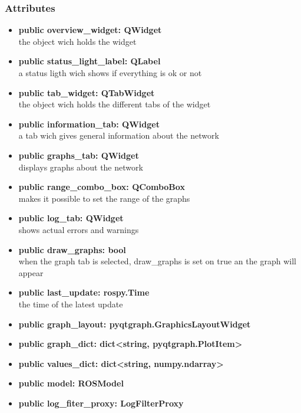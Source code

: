 \subsubsection{Attributes}
\begin{itemize}
  \item \textbf{public overview\_widget: QWidget}\\
  the object wich holds the widget
  \item \textbf{public status\_light\_label: QLabel}\\
  a status ligth wich shows if everything is ok or not
  \item \textbf{public tab\_widget: QTabWidget}\\
  the object wich holds the different tabs of the widget
  \item \textbf{public information\_tab: QWidget}\\
  a tab wich gives general information about the network 
  \item \textbf{public graphs\_tab: QWidget}\\
  displays graphs about the network
  \item \textbf{public range\_combo\_box: QComboBox}\\
  makes it possible to set the range of the graphs
  \item \textbf{public log\_tab: QWidget}\\
  shows actual errors and warnings
  \item \textbf{public draw\_graphs: bool}\\
  when the graph tab is selected, draw\_graphs is set on true an the graph will
  appear
  \item \textbf{public last\_update: rospy.Time}\\
  the time of the latest update
  \item \textbf{public graph\_layout: pyqtgraph.GraphicsLayoutWidget}\\
  
  \item \textbf{public graph\_dict: dict<string, pyqtgraph.PlotItem>}\\
  
  \item \textbf{public values\_dict: dict<string, numpy.ndarray>}\\
  
  \item \textbf{public model: ROSModel}\\
  
  \item \textbf{public log\_fiter\_proxy: LogFilterProxy}\\
  
\end{itemize}
